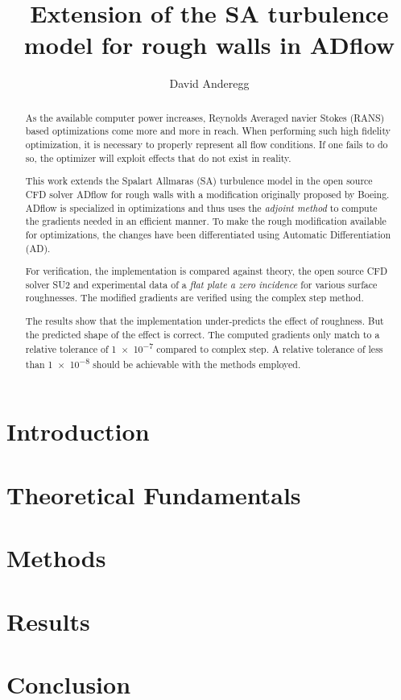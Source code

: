 \documentclass[a4paper, 10pt]{report}
\title{Extension of the SA turbulence model for rough walls in ADflow}
\author{David Anderegg}
\begin{document}
    


    \begin{abstract}
      As the available computer power increases, Reynolds Averaged navier Stokes
(RANS) based optimizations come more and more in reach. When performing such
high fidelity optimization, it is necessary to properly represent all flow
conditions. If one fails to do so, the optimizer will exploit effects that do
not exist in reality.

      This work extends the Spalart Allmaras (SA) turbulence model in the open
source CFD solver ADflow for rough walls with a modification originally proposed
by Boeing. ADflow is specialized in optimizations and thus uses the
\textit{adjoint method} to compute the gradients needed in an efficient manner.
To make the rough modification available for optimizations, the changes have
been differentiated using Automatic Differentiation (AD).

    For verification, the implementation is compared against theory, the open
source CFD solver SU2 and experimental data of a \textit{flat plate a zero
incidence} for various surface roughnesses. The modified gradients are verified
using the complex step method.

    The results show that the implementation under-predicts the effect of
roughness. But the predicted shape of the effect is correct. The computed
gradients only match to a relative tolerance of \num{1e-7} compared to complex
step. A relative tolerance of less than \num{1e-8} should be achievable with the
methods employed.


    \end{abstract}

    \tableofcontents\clearpage


    \chapter{Introduction}
    

    \chapter{Theoretical Fundamentals}
    

    \chapter{Methods}
    


    \chapter{Results}
    


    \chapter{Conclusion}
    

    \listoffigures\clearpage
    \listoftables\clearpage


    \printbibliography
\end{document}
